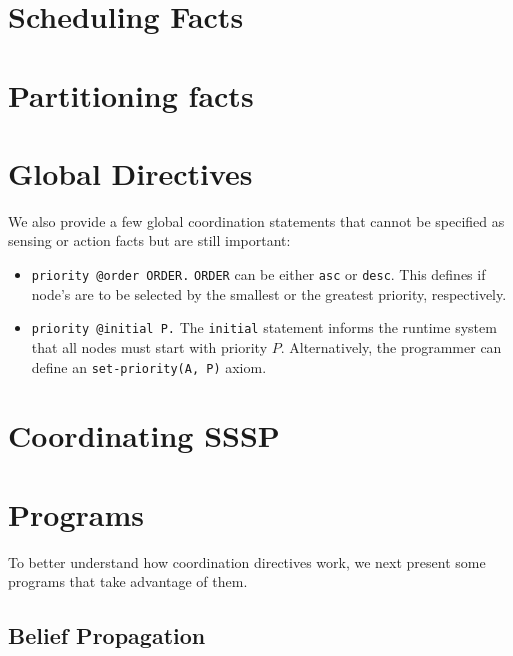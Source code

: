 

\section{Scheduling Facts}\label{sec:fifo}



\section{Partitioning facts}



\section{Global Directives}

We also provide a few global coordination statements that cannot be specified
as sensing or action facts but are still important:

\begin{itemize}

   \item \texttt{priority @order ORDER.} \texttt{ORDER} can be either
      \texttt{asc} or \texttt{desc}. This defines if node's are to be selected
      by the smallest or the greatest priority, respectively.

   \item \texttt{priority @initial P.} The \texttt{initial} statement informs
      the runtime system that all nodes must start with priority $P$.
      Alternatively, the programmer can define an \texttt{set-priority(A, P)}
      axiom.

\end{itemize}

\section{Coordinating SSSP}



\section{Programs}

To better understand how coordination directives work, we next present some programs that
take advantage of them.

\subsection{Belief Propagation}

